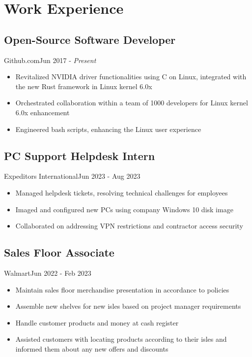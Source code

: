 \section{Work Experience}
\subsection{Open-Source Software Developer}{Github.com}{Jun 2017 - \textit{Present}}
\begin{itemize}
    \item Revitalized NVIDIA driver functionalities using C on Linux, integrated with the new Rust framework in Linux kernel 6.0x
    \item Orchestrated collaboration within a team of 1000 developers for Linux kernel 6.0x enhancement
    \item Engineered bash scripts, enhancing the Linux user experience
\end{itemize}
\subsection{PC Support Helpdesk Intern}{Expeditors International}{Jun 2023 - Aug 2023}
\begin{itemize}
    \item Managed helpdesk tickets, resolving technical challenges for employees
    \item Imaged and configured new PCs using company Windows 10 disk image
    \item Collaborated on addressing VPN restrictions and contractor access security
\end{itemize}
\subsection{Sales Floor Associate}{Walmart}{Jun 2022 - Feb 2023}
\begin{itemize}
    \item Maintain sales floor merchandise presentation in accordance to policies
    \item Assemble new shelves for new isles based on project manager requirements
    \item Handle customer products and money at cash register
    \item Assisted customers with locating products according to their isles and informed them about any
    new offers and discounts 
\end{itemize}
